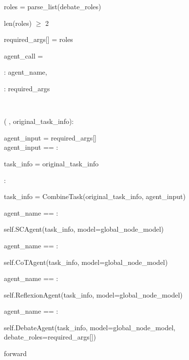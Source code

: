 \begin{subagent}[title=Low \masness Parser]
\quad\quad roles = parse\_list(debate\_roles)

\quad\quad {} len(roles) $\geq$ 2

\quad\quad required\_args[] = roles \\


\quad {}

\quad agent\_call = \code{\{}

\quad\quad {}: agent\_name,

\quad\quad {}: required\_args

\quad \code{\}} \\


\quad {}

\quad {}  (
, original\_task\_info):

\quad\quad agent\_input = required\_args[] \\

\quad\quad {} agent\_input == :

\quad\quad\quad task\_info = original\_task\_info

\quad\quad {}:

\quad\quad\quad task\_info = CombineTask(original\_task\_info,
agent\_input) \\

\quad\quad {}

\quad\quad {} agent\_name == :

\quad\quad\quad {}  self.SCAgent(task\_info, model=global\_node\_model)

\quad\quad {} agent\_name == :

\quad\quad\quad {}  self.CoTAgent(task\_info, model=global\_node\_model)

\quad\quad {} agent\_name == :

\quad\quad\quad {}  self.ReflexionAgent(task\_info, model=global\_node\_model)

\quad\quad {} agent\_name == :

\quad\quad\quad {}  self.DebateAgent(task\_info, model=global\_node\_model, debate\_roles=required\_args[])

\quad {} forward 
\end{subagent}

